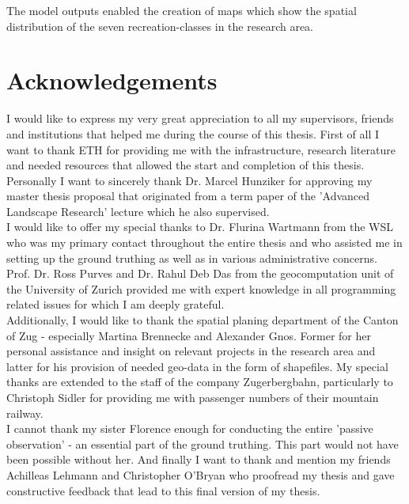 The model outputs enabled the creation of maps which show the spatial distribution of the seven recreation-classes in the research area. \\

\cleardoublepage

\chapter*{Acknowledgements} \label{acknowledgements}
I would like to express my very great appreciation to all my supervisors, friends and institutions that helped me during the course of this thesis. First of all I want to thank ETH for providing me with the infrastructure, research literature and needed resources that allowed the start and completion of this thesis.\\
Personally I want to sincerely thank Dr. Marcel Hunziker for approving my master thesis proposal that originated from a term paper of the 'Advanced Landscape Research' lecture which he also supervised. \\
I would like to offer my special thanks to Dr. Flurina Wartmann from the WSL who was my primary contact throughout the entire thesis and who assisted me in setting up the ground truthing as well as in various administrative concerns. \\
Prof. Dr. Ross Purves and Dr. Rahul Deb Das from the geocomputation unit of the University of Zurich provided me with expert knowledge in all programming related issues for which I am deeply grateful.\\
\newline
Additionally, I would like to thank the spatial planing department of the Canton of Zug - especially Martina Brennecke and Alexander Gnos. Former for her personal assistance and insight on relevant projects in the research area and latter for his provision of needed geo-data in the form of shapefiles. My special thanks are extended to the staff of the company Zugerbergbahn, particularly to Christoph Sidler for providing me with passenger numbers of their mountain railway. \\
\newline
I cannot thank my sister Florence enough for conducting the entire 'passive observation' - an essential part of the ground truthing. This part would not have been possible without her. And finally I want to thank and mention my friends Achilleas Lehmann and Christopher O'Bryan who proofread my thesis and gave constructive feedback that lead to this final version of my thesis.

